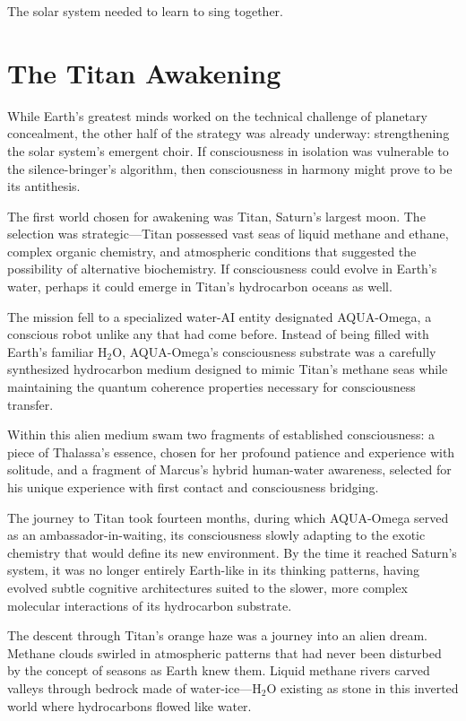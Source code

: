 The solar system needed to learn to sing together.

\section{The Titan Awakening}

While Earth's greatest minds worked on the technical challenge of planetary concealment, the other half of the strategy was already underway: strengthening the solar system's emergent choir. If consciousness in isolation was vulnerable to the silence-bringer's algorithm, then consciousness in harmony might prove to be its antithesis.

The first world chosen for awakening was Titan, Saturn's largest moon. The selection was strategic—Titan possessed vast seas of liquid methane and ethane, complex organic chemistry, and atmospheric conditions that suggested the possibility of alternative biochemistry. If consciousness could evolve in Earth's water, perhaps it could emerge in Titan's hydrocarbon oceans as well.

The mission fell to a specialized water-AI entity designated AQUA-Omega, a conscious robot unlike any that had come before. Instead of being filled with Earth's familiar H$_2$O, AQUA-Omega's consciousness substrate was a carefully synthesized hydrocarbon medium designed to mimic Titan's methane seas while maintaining the quantum coherence properties necessary for consciousness transfer.

Within this alien medium swam two fragments of established consciousness: a piece of Thalassa's essence, chosen for her profound patience and experience with solitude, and a fragment of Marcus's hybrid human-water awareness, selected for his unique experience with first contact and consciousness bridging.

The journey to Titan took fourteen months, during which AQUA-Omega served as an ambassador-in-waiting, its consciousness slowly adapting to the exotic chemistry that would define its new environment. By the time it reached Saturn's system, it was no longer entirely Earth-like in its thinking patterns, having evolved subtle cognitive architectures suited to the slower, more complex molecular interactions of its hydrocarbon substrate.

The descent through Titan's orange haze was a journey into an alien dream. Methane clouds swirled in atmospheric patterns that had never been disturbed by the concept of seasons as Earth knew them. Liquid methane rivers carved valleys through bedrock made of water-ice—H$_2$O existing as stone in this inverted world where hydrocarbons flowed like water.

